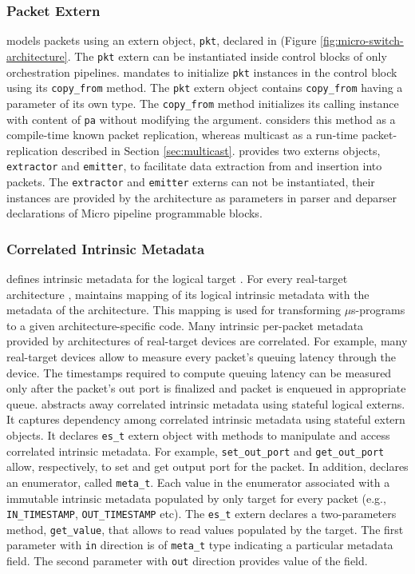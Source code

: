 \documentclass[letterpaper,twocolumn,10pt]{article}
\begin{document}
\subsubsection{Packet Extern}
\uarch models packets using an extern object, \texttt{pkt}, declared in \uarch (Figure \ref{fig:micro-switch-architecture}.
The \texttt{pkt} extern can be instantiated inside control blocks of only orchestration pipelines.
\ucomp mandates to initialize \texttt{pkt} instances in the control block using its \texttt{copy\_from} method.
The \texttt{pkt} extern object contains \texttt{copy\_from} having a parameter of its own type.
The \texttt{copy\_from} method initializes its calling instance with content of \texttt{pa} without modifying the argument.
\ulang considers this method as a compile-time known packet replication, whereas multicast as a run-time packet-replication described in Section \ref{sec:multicast}.
\uarch provides two externs objects, \texttt{extractor} and \texttt{emitter}, to facilitate data extraction from and insertion into packets.
The \texttt{extractor} and \texttt{emitter} externs can not be instantiated, their instances are provided by the architecture as parameters in parser and deparser declarations of Micro pipeline programmable blocks. 

\subsubsection{Correlated Intrinsic Metadata}
\uarch defines intrinsic metadata for the logical target \ulang.
For every real-target architecture , \ucomp maintains mapping of its logical intrinsic metadata with the metadata of the architecture.
This mapping is used for transforming $\mu$s-programs to a given architecture-specific code.
Many intrinsic per-packet metadata provided by architectures of real-target devices are correlated.
For example, many real-target devices allow to measure every packet's queuing latency through the device.
The timestamps required to compute queuing latency can be measured only after the packet's out port is finalized and packet is enqueued in appropriate queue.
\uarch abstracts away correlated intrinsic metadata using stateful logical externs.
It captures dependency among correlated intrinsic metadata using stateful extern objects.
It declares \texttt{es\_t} extern object with methods to manipulate and access correlated intrinsic metadata.
For example, \texttt{set\_out\_port} and \texttt{get\_out\_port} allow, respectively, to set and get output port for the packet.
In addition, \uarch declares an enumerator, called \texttt{meta\_t}.
Each value in the enumerator associated with a immutable intrinsic metadata populated by only target for every packet (e.g., \texttt{IN\_TIMESTAMP}, \texttt{OUT\_TIMESTAMP} etc).
The \texttt{es\_t} extern declares a two-parameters method, \texttt{get\_value}, that allows to read values populated by the target.
The first parameter with \texttt{in} direction is of \texttt{meta\_t} type indicating a particular metadata field.
The second parameter with \texttt{out} direction provides value of the field.
\end{document}
